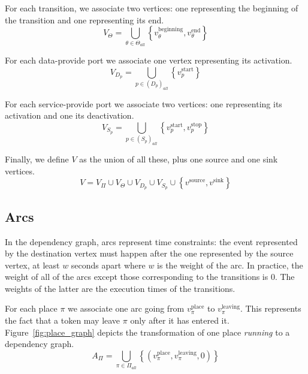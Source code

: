 For each transition, we associate two vertices: one representing the
beginning of the transition and one representing its end.
\[
V_{\Theta}=\bigcup_{\theta\in\Theta_{all}}\left\{ v_\theta^\text{beginning},v_\theta^\text{end}\right\} 
\]

For each data-provide port we associate one vertex representing its activation.
\[
V_{D_p}=\bigcup_{p\in\left(D_p\right)_{all}}\left\{ v_p^\text{start}\right\} 
\]

For each service-provide port we associate two vertices: one representing
its activation and one its deactivation.
\[
V_{S_p}=\bigcup_{p\in\left(S_p\right)_{all}}\left\{ v_p^\text{start},v_p^\text{stop}\right\} 
\]

Finally, we define $V$ as the union of all these, plus one source
and one sink vertices. 
\[
V=V_{\Pi}\cup V_{\Theta}\cup V_{D_p}\cup V_{S_p}\cup\left\{ v^\text{source},v^\text{sink}\right\} 
\]


\subsection{Arcs}

In the dependency graph, arcs represent time constraints: the event represented
by the destination vertex must happen after the one represented by the source
vertex, at least $w$ seconds apart where $w$ is the weight of the arc. In
practice, the weight of all of the arcs except those corresponding to the
transitions is 0. The weights of the latter are the execution times of the
transitions.

For each place $\pi$ we associate one arc going from $v_\pi^\text{place}$ to
$v_\pi^\text{leaving}$. This represents the fact that a token may leave $\pi$
only after it has entered it.
Figure~\ref{fig:place_graph} depicts the transformation of one place
\emph{running} to a dependency graph.
\[
A_{\Pi}=\bigcup_{\pi\in\Pi_{all}}\left\{ \left(v_\pi^\text{place},v_\pi^\text{leaving},0\right)\right\} 
\]


